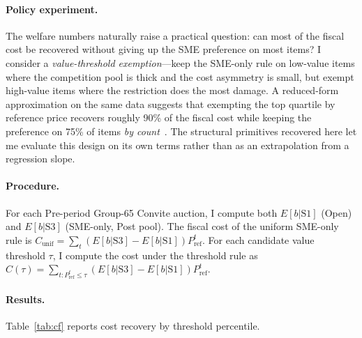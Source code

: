 \documentclass[12pt]{article}
\begin{document}
\paragraph{Policy experiment.}
The welfare numbers naturally raise a practical question: can
most of the fiscal cost be recovered without giving up the SME
preference on most items? I consider a \emph{value-threshold
exemption}---keep the SME-only rule on low-value items where the
competition pool is thick and the cost asymmetry is small, but
exempt high-value items where the restriction does the most
damage. A reduced-form approximation on the same data suggests
that exempting the top quartile by reference price recovers
roughly 90\% of the fiscal cost while keeping the preference on
75\% of items \emph{by count}~\citep{genicolo2026a}. The
structural primitives recovered here let me evaluate this design
on its own terms rather than as an extrapolation from a
regression slope.

\paragraph{Procedure.}
For each Pre-period Group-65 Convite auction, I compute both
$E[b|\text{S1}]$ (Open) and $E[b|\text{S3}]$ (SME-only, Post pool).
The fiscal cost of the uniform SME-only rule is
$C_{\text{unif}} = \sum_t (E[b|\text{S3}] - E[b|\text{S1}])
P_{\text{ref}}^t$. For each candidate value threshold $\tau$, I compute
the cost under the threshold rule as
$C(\tau) = \sum_{t: P_{\text{ref}}^t \le \tau}
(E[b|\text{S3}] - E[b|\text{S1}]) P_{\text{ref}}^t$.

\paragraph{Results.}
Table~\ref{tab:cf} reports cost recovery by threshold percentile.
\end{document}
